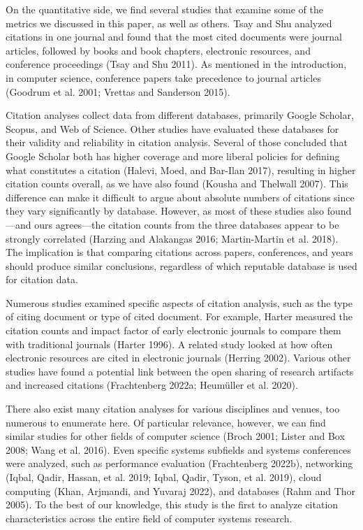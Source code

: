 \documentclass{article}
\begin{document}
On the quantitative side, we find several studies that examine some of the metrics we discussed in this paper, as well as others.
Tsay and Shu analyzed citations in one journal and found that the most cited documents were journal articles, followed by books and book chapters, electronic resources, and conference proceedings (Tsay and Shu 2011).
As mentioned in the introduction, in computer science, conference papers take precedence to journal articles (Goodrum et al. 2001; Vrettas and Sanderson 2015).

Citation analyses collect data from different databases, primarily Google Scholar, Scopus, and Web of Science.
Other studies have evaluated these databases for their validity and reliability in citation analysis.
Several of those concluded that Google Scholar both has higher coverage and more liberal policies for defining what constitutes a citation (Halevi, Moed, and Bar-Ilan 2017), resulting in higher citation counts overall, as we have also found (Kousha and Thelwall 2007).
This difference can make it difficult to argue about absolute numbers of citations since they vary significantly by database.
However, as most of these studies also found---and ours agrees---the citation counts from the three databases appear to be strongly correlated (Harzing and Alakangas 2016; Martin-Martin et al. 2018).
The implication is that comparing citations across papers, conferences, and years should produce similar conclusions, regardless of which reputable database is used for citation data.

Numerous studies examined specific aspects of citation analysis, such as the type of citing document or type of cited document.
For example, Harter measured the citation counts and impact factor of early electronic journals to compare them with traditional journals (Harter 1996).
A related study looked at how often electronic resources are cited in electronic journals (Herring 2002).
Various other studies have found a potential link between the open sharing of research artifacts and increased citations (Frachtenberg 2022a; Heumüller et al. 2020).

There also exist many citation analyses for various disciplines and venues, too numerous to enumerate here.
Of particular relevance, however, we can find similar studies for other fields of computer science (Broch 2001; Lister and Box 2008; Wang et al. 2016).
Even specific systems subfields and systems conferences were analyzed, such as performance evaluation (Frachtenberg 2022b), networking (Iqbal, Qadir, Hassan, et al. 2019; Iqbal, Qadir, Tyson, et al. 2019), cloud computing (Khan, Arjmandi, and Yuvaraj 2022), and databases (Rahm and Thor 2005).
To the best of our knowledge, this study is the first to analyze citation characteristics across the entire field of computer systems research.
\end{document}
